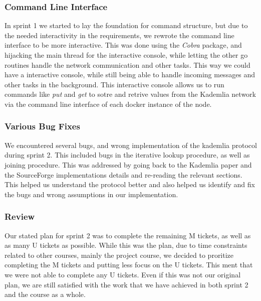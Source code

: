 \subsubsection{Command Line Interface}
In sprint 1 we started to lay the foundation for command structure, but due to the needed interactivity in the requirements, we rewrote the command line interface to be more interactive. This was done using the \textit{Cobra} package, and hijacking the main thread for the interactive console, while letting the other go routines handle the network communication and other tasks. This way we could have a interactive console, while still being able to handle incoming messages and other tasks in the background. This interactive console allows us to run commands like \textit{put} and \textit{get} to sotre and retrive values from the Kademlia network via the command line interface of each docker instance of the node.

\subsubsection{Various Bug Fixes}
We encountered several bugs, and wrong implementation of the kademlia protocol during sprint 2. This included bugs in the iterative lookup procedure, as well as joining procedure. This was addressed by going back to the Kademlia paper and the SourceForge implementations details and re-reading the relevant sections. This helped us understand the protocol better and also helped us identify and fix the bugs and wrong assumptions in our implementation.

\subsubsection{Review}
Our stated plan for sprint 2 was to complete the remaining M tickets, as well as as many U tickets as possible. While this was the plan, due to time constraints related to other courses, mainly the project course, we decided to proritize completing the M tickets and putting less focus on the U tickets. This ment that we were not able to complete any U tickets. Even if this was not our original plan, we are still satisfied with the work that we have achieved in both sprint 2 and the course as a whole.
